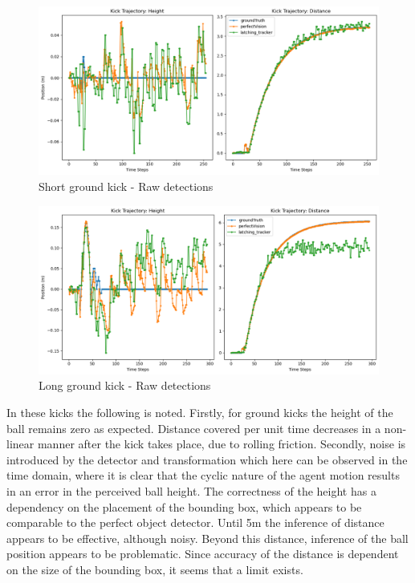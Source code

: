 \documentclass[a4paper,twoside,12pt]{report}
\begin{document}
\begin{figure}[h!]
\begin{center}
\includegraphics[width=12cm]{images/raw_ground_short.png}
\caption{Short ground kick - Raw detections}
\label{fig:rawgroundshort}
\end{center}
\end{figure}

\begin{figure}[h!]
\begin{center}
\includegraphics[width=12cm]{images/raw_ground_long.png}
\caption{Long ground kick - Raw detections}
\label{fig:rawgroundlong}
\end{center}
\end{figure}

In these kicks the following is noted. Firstly, for ground kicks the height of the ball remains zero as expected. Distance covered per unit time decreases in a non-linear manner after the kick takes place, due to rolling friction. Secondly, noise is introduced by the detector and transformation which here can be observed in the time domain, where it is clear that the cyclic nature of the agent motion results in an error in the perceived ball height. The correctness of the height has a dependency on the placement of the bounding box, which appears to be comparable to the perfect object detector. Until 5m the inference of distance appears to be effective, although noisy. Beyond this distance, inference of the ball position appears to be problematic. Since accuracy of the distance is dependent on the size of the bounding box, it seems that a limit exists.
\end{document}
